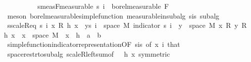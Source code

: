 \begin{isabellebody}
\ \ \ \ \ \ \ \ \isamarkupfalse%
\ s{\isacharunderscore}{\kern0pt}meas{\isacharunderscore}{\kern0pt}F{\isacharbrackleft}{\kern0pt}measurable{\isacharbrackright}{\kern0pt}{\isacharcolon}{\kern0pt}\ {\isachardoublequoteopen}s\ i\ {\isasymin}\ borel{\isacharunderscore}{\kern0pt}measurable\ F{\isachardoublequoteclose}\ \isamarkupfalse%
\ {\isacharparenleft}{\kern0pt}meson\ borel{\isacharunderscore}{\kern0pt}measurable{\isacharunderscore}{\kern0pt}simple{\isacharunderscore}{\kern0pt}function\ measurable{\isacharunderscore}{\kern0pt}in{\isacharunderscore}{\kern0pt}subalg{\isacharprime}{\kern0pt}\ s{\isacharunderscore}{\kern0pt}is{\isacharparenleft}{\kern0pt}{}{\isacharparenright}{\kern0pt}\ subalg{\isacharparenright}{\kern0pt}\isanewline
\isanewline
\ \ \ \ \ \ \ \ \isamarkupfalse%
\ s{\isacharunderscore}{\kern0pt}scaleR{\isacharunderscore}{\kern0pt}eq{\isacharcolon}{\kern0pt}\ {\isachardoublequoteopen}s\ i\ x\ {\isacharasterisk}{\kern0pt}\isactrlsub R\ h\ x\ {\isacharequal}{\kern0pt}\ {\isacharparenleft}{\kern0pt}{\isasymSum}y{\isasymin}s\ i\ {\isacharbackquote}{\kern0pt}\ space\ M{\isachardot}{\kern0pt}\ {\isacharparenleft}{\kern0pt}indicator\ {\isacharparenleft}{\kern0pt}s\ i\ {\isacharminus}{\kern0pt}{\isacharbackquote}{\kern0pt}\ {\isacharbraceleft}{\kern0pt}y{\isacharbraceright}{\kern0pt}\ {\isasyminter}\ space\ M{\isacharparenright}{\kern0pt}\ x\ {\isacharasterisk}{\kern0pt}\isactrlsub R\ y{\isacharparenright}{\kern0pt}\ {\isacharasterisk}{\kern0pt}\isactrlsub R\ h\ x{\isacharparenright}{\kern0pt}{\isachardoublequoteclose}\ \ {\isachardoublequoteopen}x\ {\isasymin}\ space\ M{\isachardoublequoteclose}\ \ x\ \ h\ {\isacharcolon}{\kern0pt}{\isacharcolon}{\kern0pt}\ {\isachardoublequoteopen}{\isacharprime}{\kern0pt}a\ {\isasymRightarrow}\ {\isacharprime}{\kern0pt}b{\isachardoublequoteclose}\ \isamarkupfalse%
\ simple{\isacharunderscore}{\kern0pt}function{\isacharunderscore}{\kern0pt}indicator{\isacharunderscore}{\kern0pt}representation{\isacharbrackleft}{\kern0pt}OF\ s{\isacharunderscore}{\kern0pt}is{\isacharparenleft}{\kern0pt}{}{\isacharparenright}{\kern0pt}{\isacharcomma}{\kern0pt}\ of\ x\ i{\isacharbrackright}{\kern0pt}\ that\ \isamarkupfalse%
\ space{\isacharunderscore}{\kern0pt}restr{\isacharunderscore}{\kern0pt}to{\isacharunderscore}{\kern0pt}subalg\ scaleR{\isacharunderscore}{\kern0pt}left{\isachardot}{\kern0pt}sum{\isacharbrackleft}{\kern0pt}of\ {\isacharunderscore}{\kern0pt}\ {\isacharunderscore}{\kern0pt}\ {\isachardoublequoteopen}h\ x{\isachardoublequoteclose}{\isacharcomma}{\kern0pt}\ symmetric{\isacharbrackright}{\kern0pt}\ \isamarkupfalse%

\end{isabellebody}
